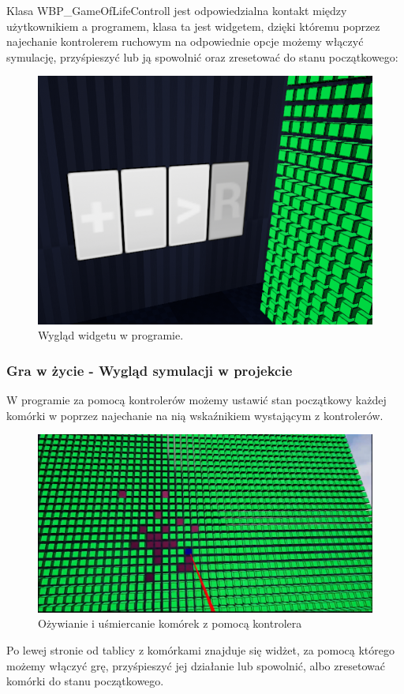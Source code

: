 \documentclass[a4paper,12pt,reqno]{article}
\begin{document}
Klasa WBP\_GameOfLifeControll jest odpowiedzialna kontakt między użytkownikiem a programem, klasa ta jest widgetem, dzięki któremu poprzez najechanie kontrolerem ruchowym na odpowiednie opcje możemy włączyć symulację, przyśpieszyć lub ją spowolnić oraz zresetować do stanu początkowego:

\begin{figure}[H]%
\centering
\includegraphics[width=0.5\columnwidth]{graphics/gameoflife/GameOfLifeControllInUE_1.png}
\caption{Wygląd widgetu w programie.
\label{BPExample}}%
%
\qquad
\end{figure}  

\subsubsection{Gra w życie - Wygląd symulacji w projekcie}
W programie za pomocą kontrolerów możemy ustawić stan początkowy każdej komórki w poprzez najechanie na nią wskaźnikiem wystającym z kontrolerów.

\begin{figure}[H]%
\centering
\includegraphics[width=0.5\columnwidth]{graphics/gameoflife/GOLInUE_3.png}
\caption{Ożywianie i uśmiercanie komórek z pomocą kontrolera
\label{BPExample}}%
%
\qquad
\end{figure}  

Po lewej stronie od tablicy z komórkami znajduje się widżet, za pomocą którego możemy włączyć grę, przyśpieszyć jej działanie lub spowolnić, albo zresetować komórki do stanu początkowego. 
\end{document}
